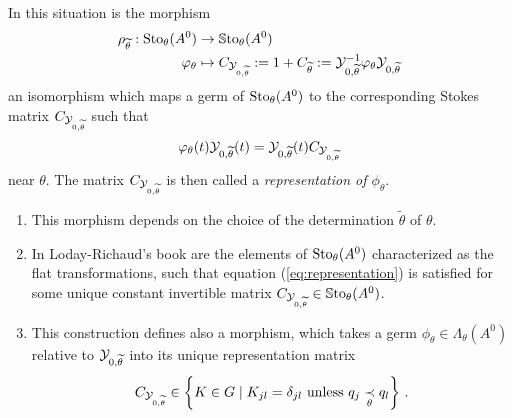 \begin{prop}\label{prop:representation}
  In this situation is the morphism
  \begin{align*}
    \rho_{\widetilde\theta}:\operatorname{Sto}_\theta(A^0)&\to\operatorname{\mathbb{S}to}_\theta(A^0)
    \\\varphi_\theta
    &\mapsto
    C_{\mathcal{Y}_{0,\widetilde\theta}}
    :=1+C_{\widetilde\theta}
    :=\mathcal{Y}_{0,\widetilde\theta}^{-1}\varphi_\theta\mathcal{Y}_{0,\widetilde\theta}
  \end{align*}
  an isomorphism which maps a germ of $\operatorname{Sto}_\theta(A^0)$ to the corresponding
  Stokes matrix $C_{\mathcal{Y}_{0,\widetilde\theta}}$ such that
  \begin{equation} \label{eq:representation}
    \varphi_\theta(t)\mathcal{Y}_{0,\widetilde\theta}(t)
    =\mathcal{Y}_{0,\widetilde\theta}(t)C_{\mathcal{Y}_{0,\widetilde\theta}}
  \end{equation}
  near $\theta$.
  The matrix $C_{\mathcal{Y}_{0,\widetilde\theta}}$ is then called a \emph{representation
  of $\phi_\theta$}.
  \begin{s-rem}
    \begin{enumerate}
      \item This morphism depends on the choice of the determination
        $\tilde\theta$ of $\theta$.
      \item In Loday-Richaud's book \cite[78]{Loday2014} are the elements of
        $\operatorname{Sto}_\theta(A^0)$ characterized as the flat transformations, such that
        equation (\ref{eq:representation}) is satisfied for some unique
        constant invertible matrix
        $C_{\mathcal{Y}_{0,\widetilde\theta}}\in\operatorname{\mathbb{S}to}_\theta(A^0)$.
      \item {}
        This construction defines also a morphism, which takes a germ
        $\phi_\theta\in\Lambda_\theta(A^0)$ relative to $\mathcal{Y}_{0,\widetilde\theta}$
        into its unique representation matrix
        \[
          C_{\mathcal{Y}_{0,\widetilde\theta}}
          \in\left\{K\in G\mid K_{jl}=\delta_{jl} \text{ unless }
          q_j \underset{\theta}{\prec} q_l \right\} \,.
        \]
    \end{enumerate}
  \end{s-rem}
\end{prop}
